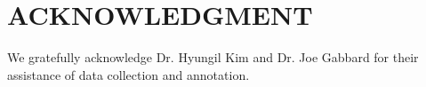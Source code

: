 \documentclass[letterpaper, 10 pt, conference]{ieeeconf}  %
\begin{document}
\addtolength{\textheight}{-0cm}   %


\section*{ACKNOWLEDGMENT}

We gratefully acknowledge Dr. Hyungil Kim and Dr. Joe Gabbard for their assistance 
of data collection and annotation.



\end{document}

